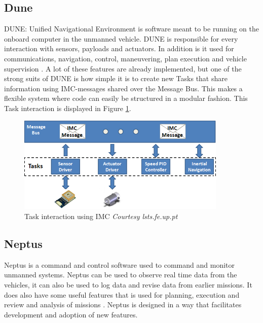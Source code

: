 \subsection{Dune}
DUNE: Unified Navigational Environment is software meant to be running on the onboard computer in the unmanned vehicle. DUNE is responsible for every interaction with sensors, payloads and actuators. In addition is it used for communications, navigation, control, maneuvering, plan execution and vehicle supervision \citep{DUNE}. A lot of these features are already implemented, but one of the strong suits of DUNE is how simple it is to create new Tasks that share information using IMC-messages shared over the Message Bus. This makes a flexible system where code can easily be structured in a modular fashion. This Task interaction is displayed in Figure \ref{dune_imc}.
\begin{figure}[H]
\centering
\includegraphics[width = 10cm]{fig/description/dune_imc.png}
\caption{Task interaction using IMC \textit{Courtesy lsts.fe.up.pt}}
\label{dune_imc}
\end{figure}
\subsection{Neptus}
Neptus is a command and control software used to command and monitor unmanned systems. Neptus can be used to observe real time data from the vehicles, it can also be used to log data and revise data from earlier missions. It does also have some useful features that is used for planning, execution and review and analysis of missions \citep{neptus}. Neptus is designed in a way that facilitates development and adoption of new features.
